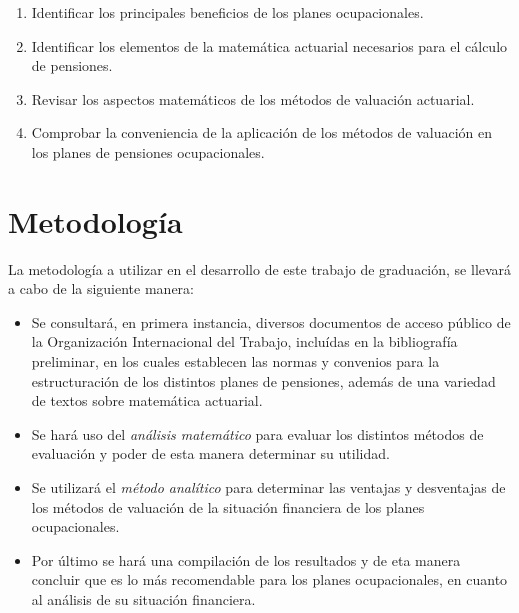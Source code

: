 \documentclass[12pt,letterpaper,titlepage]{article}
\begin{document}
\begin{enumerate}
	\item Identificar los principales beneficios de los planes ocupacionales.
	\item Identificar los elementos de la matemática actuarial necesarios para el cálculo de pensiones.
	\item Revisar los aspectos matemáticos de los métodos de valuación actuarial.
	\item Comprobar la conveniencia de la aplicación de los métodos de valuación en los planes de pensiones ocupacionales. 
\end{enumerate}

\newpage

\section{Metodología}

La metodología a utilizar en el desarrollo de este trabajo de graduación, se llevará a cabo de la siguiente manera:

\begin{itemize}
	\item Se consultará, en primera instancia, diversos documentos de acceso público de la Organización Internacional del Trabajo, incluídas en la bibliografía preliminar,  en los cuales establecen las normas y convenios para la estructuración de los distintos planes de pensiones, además de una variedad de textos sobre matemática actuarial.
	
	\item Se hará uso del \textit{análisis matemático} para evaluar los distintos métodos de evaluación y poder de esta manera determinar su utilidad.
	 
	\item Se utilizará el \textit{método analítico} para determinar las ventajas y desventajas de los métodos de valuación de la situación financiera de los planes ocupacionales.
	
	\item Por último se hará una compilación de los resultados y de eta manera concluir que es lo más recomendable para los planes ocupacionales, en cuanto al análisis de su situación financiera.
\end{itemize}

\newpage
\end{document}
